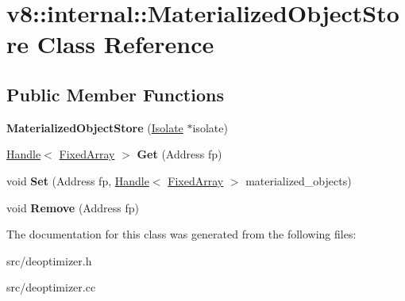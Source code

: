 \hypertarget{classv8_1_1internal_1_1_materialized_object_store}{}\section{v8\+:\+:internal\+:\+:Materialized\+Object\+Store Class Reference}
\label{classv8_1_1internal_1_1_materialized_object_store}
\subsection*{Public Member Functions}
\begin{DoxyCompactItemize}
\item 
\hypertarget{classv8_1_1internal_1_1_materialized_object_store_acd26a61a51e0b3cfef28e03f99a12b62}{}{\bfseries Materialized\+Object\+Store} (\hyperlink{classv8_1_1internal_1_1_isolate}{Isolate} $\ast$isolate)\label{classv8_1_1internal_1_1_materialized_object_store_acd26a61a51e0b3cfef28e03f99a12b62}

\item 
\hypertarget{classv8_1_1internal_1_1_materialized_object_store_aa0d2defd96ec00cdcfc6c17c7b7d3227}{}\hyperlink{classv8_1_1internal_1_1_handle}{Handle}$<$ \hyperlink{classv8_1_1internal_1_1_fixed_array}{Fixed\+Array} $>$ {\bfseries Get} (Address fp)\label{classv8_1_1internal_1_1_materialized_object_store_aa0d2defd96ec00cdcfc6c17c7b7d3227}

\item 
\hypertarget{classv8_1_1internal_1_1_materialized_object_store_a61f53bcfdd0d2a56191e2447a51913b6}{}void {\bfseries Set} (Address fp, \hyperlink{classv8_1_1internal_1_1_handle}{Handle}$<$ \hyperlink{classv8_1_1internal_1_1_fixed_array}{Fixed\+Array} $>$ materialized\+\_\+objects)\label{classv8_1_1internal_1_1_materialized_object_store_a61f53bcfdd0d2a56191e2447a51913b6}

\item 
\hypertarget{classv8_1_1internal_1_1_materialized_object_store_a283efcaf9c844a1cab4172cb236462c4}{}void {\bfseries Remove} (Address fp)\label{classv8_1_1internal_1_1_materialized_object_store_a283efcaf9c844a1cab4172cb236462c4}

\end{DoxyCompactItemize}


The documentation for this class was generated from the following files\+:\begin{DoxyCompactItemize}
\item 
src/deoptimizer.\+h\item 
src/deoptimizer.\+cc\end{DoxyCompactItemize}
